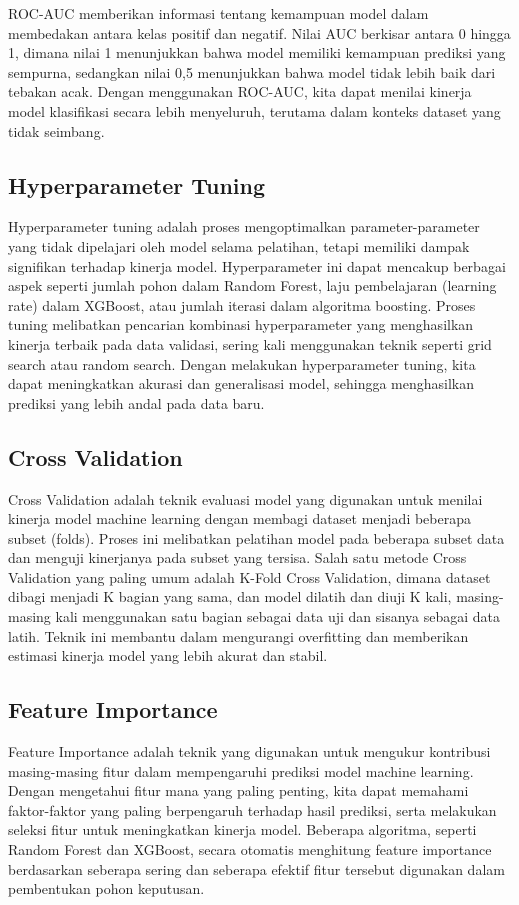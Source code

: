ROC-AUC memberikan informasi tentang kemampuan model dalam membedakan antara kelas positif dan negatif. Nilai AUC berkisar antara 0 hingga 1, dimana nilai 1 menunjukkan bahwa model memiliki kemampuan prediksi yang sempurna, sedangkan nilai 0,5 menunjukkan bahwa model tidak lebih baik dari tebakan acak. Dengan menggunakan ROC-AUC, kita dapat menilai kinerja model klasifikasi secara lebih menyeluruh, terutama dalam konteks dataset yang tidak seimbang.

\subsection{Hyperparameter Tuning}
Hyperparameter tuning adalah proses mengoptimalkan parameter-parameter yang tidak dipelajari oleh model selama pelatihan, tetapi memiliki dampak signifikan terhadap kinerja model. Hyperparameter ini dapat mencakup berbagai aspek seperti jumlah pohon dalam Random Forest, laju pembelajaran (learning rate) dalam XGBoost, atau jumlah iterasi dalam algoritma boosting. Proses tuning melibatkan pencarian kombinasi hyperparameter yang menghasilkan kinerja terbaik pada data validasi, sering kali menggunakan teknik seperti grid search atau random search. Dengan melakukan hyperparameter tuning, kita dapat meningkatkan akurasi dan generalisasi model, sehingga menghasilkan prediksi yang lebih andal pada data baru. \parencite{bergstra2012random}

\subsection{Cross Validation}
Cross Validation adalah teknik evaluasi model yang digunakan untuk menilai kinerja model machine learning dengan membagi dataset menjadi beberapa subset (folds). Proses ini melibatkan pelatihan model pada beberapa subset data dan menguji kinerjanya pada subset yang tersisa. Salah satu metode Cross Validation yang paling umum adalah K-Fold Cross Validation, dimana dataset dibagi menjadi K bagian yang sama, dan model dilatih dan diuji K kali, masing-masing kali menggunakan satu bagian sebagai data uji dan sisanya sebagai data latih. Teknik ini membantu dalam mengurangi overfitting dan memberikan estimasi kinerja model yang lebih akurat dan stabil. \parencite{arlot2010survey}

\subsection{Feature Importance}
Feature Importance adalah teknik yang digunakan untuk mengukur kontribusi masing-masing fitur dalam mempengaruhi prediksi model machine learning. Dengan mengetahui fitur mana yang paling penting, kita dapat memahami faktor-faktor yang paling berpengaruh terhadap hasil prediksi, serta melakukan seleksi fitur untuk meningkatkan kinerja model. Beberapa algoritma, seperti Random Forest dan XGBoost, secara otomatis menghitung feature importance berdasarkan seberapa sering dan seberapa efektif fitur tersebut digunakan dalam pembentukan pohon keputusan.\parencite{molnar2020interpretable}

